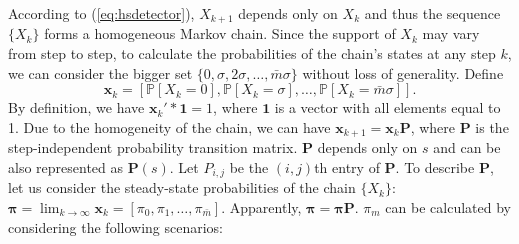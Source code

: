 \documentclass[conference]{IEEEtran}
\begin{document}
According to (\ref{eq:hsdetector}), $X_{k+1}$ depends only on $X_k$ and thus the sequence $\{X_k\}$ forms a homogeneous Markov chain. Since the support of $X_k$ may vary from step to step, to calculate the probabilities of the chain's states at any step $k$, we can consider the bigger set $\{0,\sigma,2\sigma,\ldots,\bar{m}\sigma\}$ without loss of generality. Define
\begin{equation}\label{eq:Xi}
    \boldsymbol{x}_k=\left[\mathbb{P}[X_k=0],\mathbb{P}[X_k=\sigma],\ldots,\mathbb{P}[X_k=\bar{m}\sigma]\right].
\end{equation}
By definition, we have $\boldsymbol{x}_k'*\boldsymbol1=1$, where $\boldsymbol1$ is a vector with all elements equal to 1. Due to the homogeneity of the chain, we can have $\boldsymbol{x}_{k+1}=\boldsymbol{x}_k \mathbf{P}$, where $\mathbf{P}$ is the step-independent probability transition matrix. $\mathbf{P}$ depends only on $s$ and can be also represented as $\mathbf{P}(s)$. Let $P_{i,j}$ be the $(i,j)$th entry of $\mathbf{P}$. To describe $\mathbf{P}$, let us consider the steady-state probabilities of the chain $\{X_k\}$: $\boldsymbol\pi=\lim_{k\to\infty}\boldsymbol{x}_k=[\pi_0,\pi_1,\ldots,\pi_{\bar{m}}]$. Apparently, $\boldsymbol\pi =\boldsymbol\pi \mathbf{P}$. $\pi_m$ can be calculated by considering the following scenarios:
\end{document}

